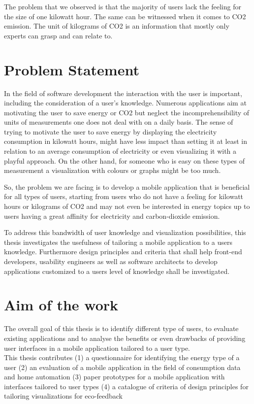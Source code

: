  The problem that we observed is that the majority of users lack the feeling for the size of one kilowatt hour. The same can be witnessed when it comes to CO2 emission. The unit of kilograms of CO2 is an information that mostly only experts can grasp and can relate to.

\section{Problem Statement}

In the field of software development the interaction with the user is important, including the consideration of a user's knowledge. Numerous applications aim at motivating the user to save energy or CO2 but neglect the incomprehensibility of units of measurements one does not deal with on a daily basis. The sense of trying to motivate the user to save energy by displaying the electricity consumption in kilowatt hours, might have less impact than setting it at least in relation to an average consumption of electricity or even visualizing it with a playful approach. On the other hand, for someone who is easy on these types of measurement a visualization with colours or graphs might be too much.

So, the problem we are facing is to develop a mobile application that is beneficial for all types of users, starting from users who do not have a feeling for kilowatt hours or kilograms of CO2 and may not even be interested in energy topics up to users having a great affinity for electricity and carbon-dioxide emission.

To address this bandwidth of user knowledge and visualization possibilities, this thesis investigates the usefulness of tailoring a mobile application to a users knowledge. Furthermore design principles and criteria that shall help front-end developers, usability engineers as well as software architects to develop applications customized to a users level of knowledge shall be investigated.

\section{Aim of the work} 
The overall goal of this thesis is to identify different type of users, to evaluate existing applications and to analyse the benefits or even drawbacks of providing user interfaces in a mobile application tailored to a user type.\\
This thesis contributes 
(1) a questionnaire for identifying the energy type of a user 
(2) an evaluation of a mobile application in the field of consumption data and home automation
(3) paper prototypes for a mobile application with interfaces tailored to user types
(4) a catalogue of criteria of design principles for tailoring visualizations for eco-feedback

